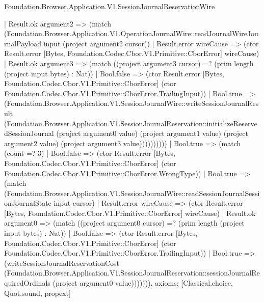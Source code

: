 \begin{lexlean}{Foundation.Browser.Application.V1.SessionJournalReservationWire}
\begin{semanticmodule}
{              | Result.ok argument2 => (match (Foundation.Browser.Application.V1.OperationJournalWire::readJournalWireJournalPayload input (project argument2 cursor))
                | Result.error wireCause => (ctor Result.error [Bytes, Foundation.Codec.Cbor.V1.Primitive::CborError] wireCause)
                | Result.ok argument3 => (match ((project argument3 cursor) =? (prim length (project input bytes) : Nat))
                  | Bool.false => (ctor Result.error [Bytes, Foundation.Codec.Cbor.V1.Primitive::CborError] (ctor Foundation.Codec.Cbor.V1.Primitive::CborError.TrailingInput))
                  | Bool.true => (Foundation.Browser.Application.V1.SessionJournalWire::writeSessionJournalResult (Foundation.Browser.Application.V1.SessionJournalReservation::initializeReservedSessionJournal (project argument0 value) (project argument1 value) (project argument2 value) (project argument3 value))))))))))
    | Bool.true => (match (count =? 3)
      | Bool.false => (ctor Result.error [Bytes, Foundation.Codec.Cbor.V1.Primitive::CborError] (ctor Foundation.Codec.Cbor.V1.Primitive::CborError.WrongType))
      | Bool.true => (match (Foundation.Browser.Application.V1.SessionJournalWire::readSessionJournalSessionJournalState input cursor)
        | Result.error wireCause => (ctor Result.error [Bytes, Foundation.Codec.Cbor.V1.Primitive::CborError] wireCause)
        | Result.ok argument0 => (match ((project argument0 cursor) =? (prim length (project input bytes) : Nat))
          | Bool.false => (ctor Result.error [Bytes, Foundation.Codec.Cbor.V1.Primitive::CborError] (ctor Foundation.Codec.Cbor.V1.Primitive::CborError.TrailingInput))
          | Bool.true => (writeSessionJournalReservationCost (Foundation.Browser.Application.V1.SessionJournalReservation::sessionJournalRequiredOrdinals (project argument0 value))))))),
  axioms: [Classical.choice, Quot.sound, propext]
}


\end{semanticmodule}
\end{lexlean}
